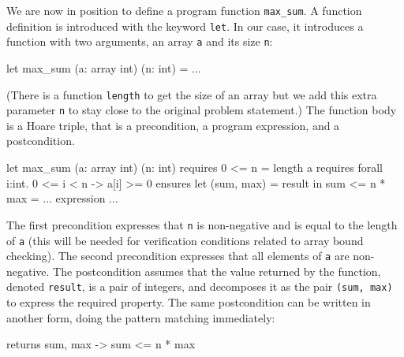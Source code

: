 We are now in position to define a program function
\verb|max_sum|. A function definition is introduced with the keyword
\texttt{let}. In our case, it introduces a function with two arguments,
an array \texttt{a} and its size \texttt{n}:
\begin{whycode}
  let max_sum (a: array int) (n: int) = ...
\end{whycode}
(There is a function \texttt{length} to get the size of an array but
we add this extra parameter \texttt{n} to stay close to the original
problem statement.) The function body is a Hoare triple, that is a
precondition, a program expression, and a postcondition.
\begin{whycode}
  let max_sum (a: array int) (n: int)
    requires { 0 <= n = length a }
    requires { forall i:int. 0 <= i < n -> a[i] >= 0 }
    ensures  { let (sum, max) = result in sum <= n * max }
  = ... expression ...
\end{whycode}
The first precondition expresses that \texttt{n} is non-negative and is
equal to the length of \texttt{a} (this will be needed for
verification conditions related to array bound checking).
The second precondition expresses that all
elements of \texttt{a} are non-negative.
The postcondition assumes that the value returned by the function,
denoted \texttt{result}, is a pair of integers, and decomposes it as
the pair \texttt{(sum, max)} to express the required property.
The same postcondition can be written in another form, doing the
pattern matching immediately:
\begin{whycode}
    returns { sum, max -> sum <= n * max }
\end{whycode}

